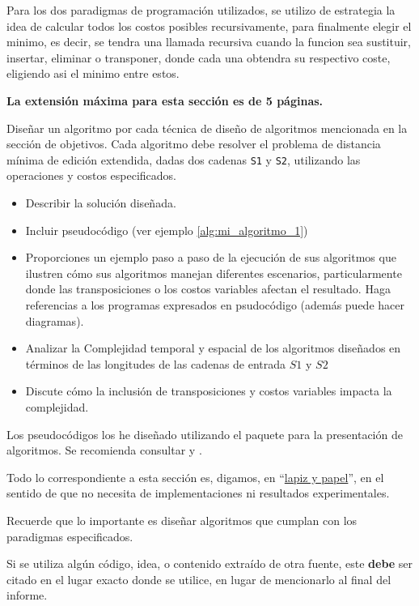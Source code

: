 Para los dos paradigmas de programación utilizados, se utilizo de estrategia la idea de calcular todos los costos posibles recursivamente, para finalmente elegir el minimo, es decir, se tendra una llamada recursiva cuando la funcion sea sustituir, insertar, eliminar o transponer, donde cada una obtendra su respectivo coste, eligiendo asi el minimo entre estos.


\begin{mdframed}
    \textbf{La extensión máxima para esta sección es de 5 páginas.}
\end{mdframed}

Diseñar un algoritmo por cada técnica de diseño de algoritmos mencionada en la sección de objetivos. Cada algoritmo debe resolver el problema de distancia mínima de edición extendida, dadas dos cadenas \texttt{S1} y \texttt{S2}, utilizando las operaciones y costos especificados.

\begin{itemize}
    \item Describir la solución diseñada. 
    \item Incluir pseudocódigo (ver ejemplo \cref{alg:mi_algoritmo_1})
    \item Proporciones un ejemplo paso a paso de la ejecución de sus algoritmos que ilustren cómo sus algoritmos manejan diferentes escenarios, particularmente donde las
    transposiciones o los costos variables afectan el
    resultado. Haga referencias a los programas expresados en psudocódigo (además puede hacer diagramas).
    \item Analizar la Complejidad temporal y espacial de los algoritmos diseñados en términos de las longitudes de las cadenas de entrada $S1$ y $S2$
    \item Discute cómo la inclusión de transposiciones y costos   variables impacta la complejidad.
\end{itemize}

Los pseudocódigos los he diseñado utilizando el paquete  \cite{algorithm2e} para la presentación de algoritmos. Se recomienda consultar  \cite{ctan-algorithm2e} y  \cite{overleaf-algorithms}.

Todo lo correspondiente a esta sección es, digamos, en ``\href{https://dle.rae.es/metáfora}{lapiz y papel}'', en el sentido de que no necesita de implementaciones ni resultados experimentales. 

\begin{mdframed}
    Recuerde que lo importante es diseñar algoritmos que cumplan con los paradigmas especificados. 
\end{mdframed}

\begin{mdframed}
    Si se utiliza algún código, idea, o contenido extraído de otra fuente, este \textbf{debe} ser citado en el lugar exacto donde se utilice, en lugar de mencionarlo al final del informe. 
\end{mdframed}


